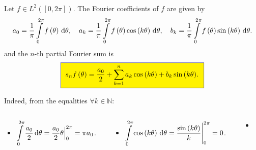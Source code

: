 \begin{frame}
	\frametitle{\secname}

	\begin{definition}
		Let
		\begin{math}
			f\in L^{2}\left(\left[0,2\pi\right]\right)
		\end{math}.
		The \alert{Fourier coefficients} of $f$ are given by
		\begin{equation*}
			a_{0}=\frac{1}{\pi}
			\int\limits_{0}^{2\pi}
			f\left(\theta\right)\dl\theta,\quad
			a_{k} =
			\frac{1}{\pi}
			\int\limits_{0}^{2\pi}
			f\left(\theta\right)\cos\left(k\theta\right)\dl\theta,\quad
			b_{k} =
			\frac{1}{\pi}
			\int\limits_{0}^{2\pi}
			f\left(\theta\right)\sin\left(k\theta\right)\dl\theta.
		\end{equation*}
		and the \alert{$n$-th partial Fourier sum} is
		\begin{equation*}
			\fcolorbox{DarkBlue}{yellow}{
				\begin{math}
					\displaystyle
					s_{n}f\left(\theta\right)=
					\frac{a_{0}}{2}+
					\sum_{k=1}^{n}
					a_{k}\cos\left(k\theta\right)+
					b_{k}\sin\left(k\theta\right)
				\end{math}.
			}
		\end{equation*}
	\end{definition}

	Indeed, from the equalities $\forall k\in\mathds{N}$:
	\begin{columns}
		\begin{column}{0.25\textwidth}
			\begin{itemize}
				\item

				      \begin{math}
					      \displaystyle
					      \int\limits_{0}^{2\pi}
					      \frac{a_{0}}{2}
					      \dl\theta=
					      \frac{a_{0}}{2}
					      {
						      \theta
						      \Bigr|
					      }_{0}^{2\pi}=
					      \pi a_{0}
				      \end{math}.
			\end{itemize}
		\end{column}
		\begin{column}{0.35\textwidth}
			\begin{itemize}
				\item

				      \begin{math}
					      \displaystyle
					      \int\limits_{0}^{2\pi}
					      \cos\left(k\theta\right)\dl\theta=
					      {
					      \frac{\sin\left(k\theta\right)}{k}
					      \Biggr|
					      }_{0}^{2\pi}=
					      0
				      \end{math}.
			\end{itemize}
		\end{column}
		\begin{column}{0.35\textwidth}
			\begin{itemize}
				\item


\end{itemize}
\end{column}
\end{columns}
\end{frame}
